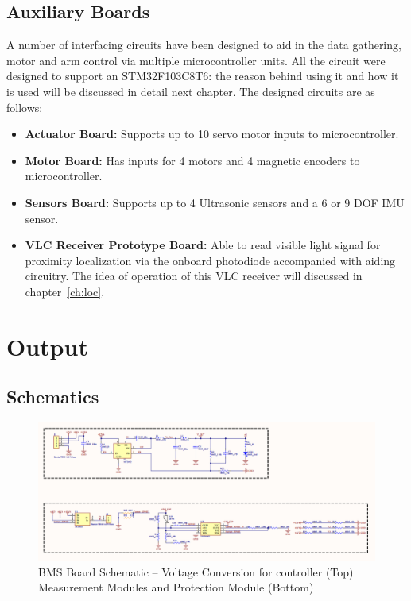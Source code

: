 \subsection{Auxiliary Boards}

A number of interfacing circuits have been designed to aid in the data gathering, motor and arm control via multiple microcontroller units. All the circuit were designed to support an STM32F103C8T6: the reason behind using it and how it is used will be discussed in detail next chapter. The designed circuits are as follows:
\begin{itemize}
	\item \textbf{Actuator Board:} Supports up to 10 servo motor inputs to microcontroller.
	\item \textbf{Motor Board:} Has inputs for 4 motors and 4 magnetic encoders to microcontroller.
	\item \textbf{Sensors Board:} Supports up to 4 Ultrasonic sensors and a 6 or 9 DOF IMU sensor.
	\item \textbf{VLC Receiver Prototype Board:} Able to read visible light signal for proximity localization via the onboard photodiode accompanied with aiding circuitry. The idea of operation of this VLC receiver will discussed in chapter~\ref{ch:loc}.
\end{itemize}

\newpage

\section{Output}

\subsection{Schematics}

\begin{figure}[h!]
	\centering
	\includegraphics[scale=0.4]{Figures/HW/schem-bms-1.png}
	\caption{BMS Board Schematic -- Voltage Conversion for controller (Top) Measurement Modules and Protection Module (Bottom)}
	\label{fig:hw-bms-schem-1}
\end{figure}

